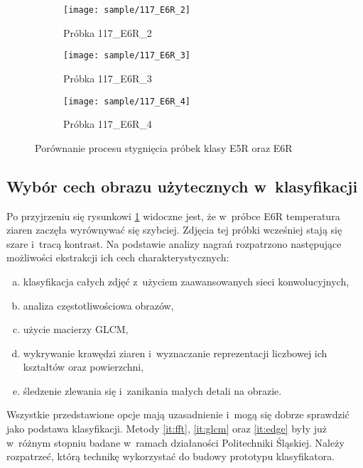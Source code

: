 \begin{figure}[htbp]
\begin{subfigure}{0.3\textwidth}
	\end{subfigure}
	\hspace{0.25cm}
	\vspace{0.5cm}
	\begin{subfigure}{0.3\textwidth}
		\centering
		\texttt{[image: sample/117\_E6R\_2]}
		\caption{Próbka 117\_E6R\_2}
	\end{subfigure}
	\hspace{0.25cm}
	\begin{subfigure}{0.3\textwidth}
		\centering
		\texttt{[image: sample/117\_E6R\_3]}
		\caption{Próbka 117\_E6R\_3}
	\end{subfigure}
	\begin{subfigure}{0.3\textwidth}
		\centering
		\texttt{[image: sample/117\_E6R\_4]}
		\caption{Próbka 117\_E6R\_4}
	\end{subfigure}
	\caption{Porównanie procesu stygnięcia próbek klasy E5R oraz E6R}
	\label{fig:samplecompare}
\end{figure}

\subsection{Wybór cech obrazu użytecznych w~klasyfikacji}
\label{subsec:featureextr}
Po przyjrzeniu się rysunkowi \ref{fig:samplecompare} widoczne jest, że
w~próbce E6R temperatura ziaren zaczęła wyrównywać się szybciej.
Zdjęcia tej próbki wcześniej stają się szare i~tracą kontrast.
Na podstawie analizy nagrań rozpatrzono następujące możliwości ekstrakcji
ich cech charakterystycznych:
\begin{enumerate}[a)]
	\item \label{it:imgcnn} 
	      klasyfikacja całych zdjęć z~użyciem zaawansowanych sieci
	      konwolucyjnych,
	\item \label{it:fft} 
	      analiza częstotliwościowa obrazów,
	\item \label{it:glcm} 
	      użycie macierzy GLCM,
	\item \label{it:edge}
	      wykrywanie krawędzi ziaren i~wyznaczanie reprezentacji liczbowej
	      ich kształtów oraz powierzchni,
	\item \label{it:blob}
	      śledzenie zlewania się i~zanikania małych detali na obrazie.
\end{enumerate}
Wszystkie przedstawione opcje mają uzasadnienie i~mogą się dobrze sprawdzić
jako podstawa klasyfikacji.
Metody \ref{it:fft}, \ref{it:glcm} oraz \ref{it:edge} były już w~różnym
stopniu badane w~ramach działaności Politechniki Śląskiej.
Należy rozpatrzeć, którą technikę wykorzystać do budowy prototypu
klasyfikatora.

